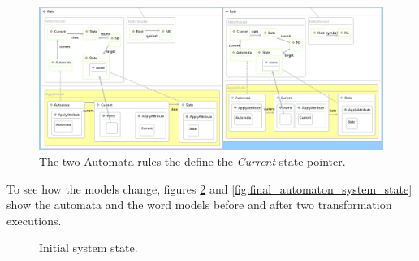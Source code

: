 \begin{figure}[h]
\begin{center}
  \includegraphics[width=\textwidth]{imgs/ExecuteAutomataTransformationOutlineAutomataRule.png}
  \caption{The two Automata rules the define the \emph{Current} state pointer.}
  \label{fig:ExecuteAutomataTransformationOutlineAutomataRule}
\end{center}
\end{figure}

To see how the models change, figures \ref{fig:initial_automaton_system_state} and \ref{fig:final_automaton_system_state} show the automata and the word models before and after two transformation executions.


\begin{figure}[h]
\begin{center}
  \caption{Initial system state.}
  \label{fig:initial_automaton_system_state}
\end{center}
\end{figure}



